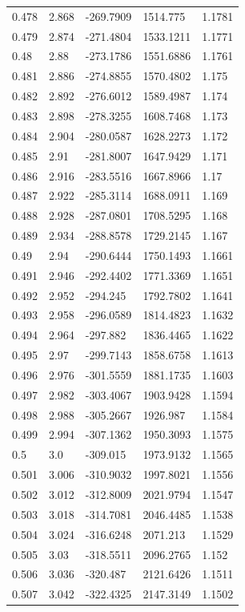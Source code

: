 \begin{tabular}{lllll}
0.478 & 2.868 & -269.7909 & 1514.775 & 1.1781 \\
0.479 & 2.874 & -271.4804 & 1533.1211 & 1.1771 \\
0.48 & 2.88 & -273.1786 & 1551.6886 & 1.1761 \\
0.481 & 2.886 & -274.8855 & 1570.4802 & 1.175 \\
0.482 & 2.892 & -276.6012 & 1589.4987 & 1.174 \\
0.483 & 2.898 & -278.3255 & 1608.7468 & 1.173 \\
0.484 & 2.904 & -280.0587 & 1628.2273 & 1.172 \\
0.485 & 2.91 & -281.8007 & 1647.9429 & 1.171 \\
0.486 & 2.916 & -283.5516 & 1667.8966 & 1.17 \\
0.487 & 2.922 & -285.3114 & 1688.0911 & 1.169 \\
0.488 & 2.928 & -287.0801 & 1708.5295 & 1.168 \\
0.489 & 2.934 & -288.8578 & 1729.2145 & 1.167 \\
0.49 & 2.94 & -290.6444 & 1750.1493 & 1.1661 \\
0.491 & 2.946 & -292.4402 & 1771.3369 & 1.1651 \\
0.492 & 2.952 & -294.245 & 1792.7802 & 1.1641 \\
0.493 & 2.958 & -296.0589 & 1814.4823 & 1.1632 \\
0.494 & 2.964 & -297.882 & 1836.4465 & 1.1622 \\
0.495 & 2.97 & -299.7143 & 1858.6758 & 1.1613 \\
0.496 & 2.976 & -301.5559 & 1881.1735 & 1.1603 \\
0.497 & 2.982 & -303.4067 & 1903.9428 & 1.1594 \\
0.498 & 2.988 & -305.2667 & 1926.987 & 1.1584 \\
0.499 & 2.994 & -307.1362 & 1950.3093 & 1.1575 \\
0.5 & 3.0 & -309.015 & 1973.9132 & 1.1565 \\
0.501 & 3.006 & -310.9032 & 1997.8021 & 1.1556 \\
0.502 & 3.012 & -312.8009 & 2021.9794 & 1.1547 \\
0.503 & 3.018 & -314.7081 & 2046.4485 & 1.1538 \\
0.504 & 3.024 & -316.6248 & 2071.213 & 1.1529 \\
0.505 & 3.03 & -318.5511 & 2096.2765 & 1.152 \\
0.506 & 3.036 & -320.487 & 2121.6426 & 1.1511 \\
0.507 & 3.042 & -322.4325 & 2147.3149 & 1.1502 \\

\end{tabular}

